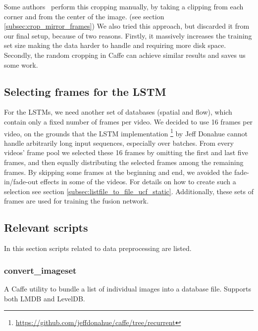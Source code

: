 Some authors~\cite{ye2015evaluating} perform this cropping manually, by taking a clipping from each corner and from the center of the image. (see section \ref{subsec:crop_mirror_frames})
We also tried this approach, but discarded it from our final setup, because of two reasons.
Firstly, it massively increases the training set size making the data harder to handle and requiring more disk space.
Secondly, the random cropping in Caffe can achieve similar results and saves us some work.

\subsection{Selecting frames for the LSTM}
For the LSTMs, we need another set of databases (spatial and flow), which contain only a fixed number of frames per video.
We decided to use 16 frames per video, on the grounds that the LSTM implementation \footnote{\url{https://github.com/jeffdonahue/caffe/tree/recurrent}} by Jeff Donahue cannot handle arbitrarily long input sequences, especially over batches.
From every videos' frame pool we selected these 16 frames by omitting the first and last five frames, and then equally distributing the selected frames among the remaining frames.
By skipping some frames at the beginning and end, we avoided the fade-in/fade-out effects in some of the videos.
For details on how to create such a selection see section \ref{subsec:listfile_to_file_ucf_static}.
Additionally, these sets of frames are used for training the fusion network.

\subsection{Relevant scripts}

In this section scripts related to data preprocessing are listed.

\subsubsection{convert\_imageset}
A Caffe utility to bundle a list of individual images into a database file. Supports both LMDB and LevelDB.

